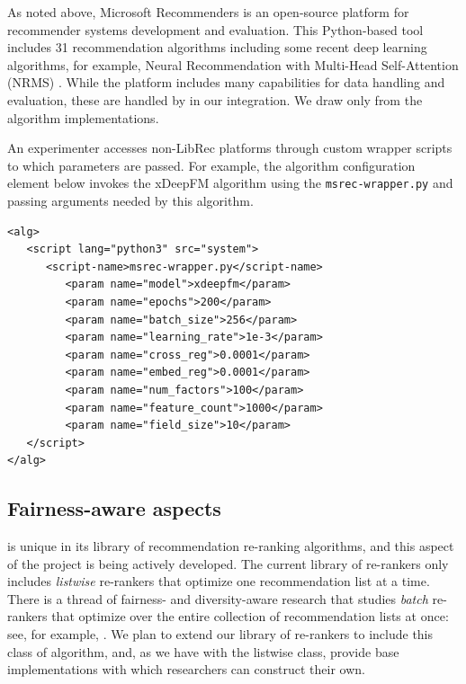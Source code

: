
As noted above, Microsoft Recommenders \cite{MicrosoftRecommenders} is an open-source platform for recommender systems development and evaluation. This Python-based tool includes 31 recommendation algorithms including some recent deep learning algorithms, for example, Neural Recommendation with Multi-Head Self-Attention (NRMS) \cite{wu2019neural}. While the platform includes many capabilities for data handling and evaluation, these are handled by \libauto{} in our integration. We draw only from the algorithm implementations. 

An experimenter accesses non-LibRec platforms through custom wrapper scripts to which parameters are passed. For example, the algorithm configuration element below invokes the xDeepFM  algorithm using the \texttt{msrec-wrapper.py} and passing arguments needed by this algorithm.

{\small
\begin{verbatim}
<alg>
   <script lang="python3" src="system">
      <script-name>msrec-wrapper.py</script-name>
         <param name="model">xdeepfm</param>
         <param name="epochs">200</param>
         <param name="batch_size">256</param>
         <param name="learning_rate">1e-3</param>
         <param name="cross_reg">0.0001</param>
         <param name="embed_reg">0.0001</param>
         <param name="num_factors">100</param>
         <param name="feature_count">1000</param>
         <param name="field_size">10</param>
   </script>
</alg>
\end{verbatim}}

\subsection{Fairness-aware aspects}
\libauto{} is unique in its library of recommendation re-ranking algorithms, and this aspect of the project is being actively developed. The current library of re-rankers only includes \textit{listwise} re-rankers that optimize one recommendation list at a time. There is a thread of fairness- and diversity-aware research that studies \textit{batch} re-rankers that optimize over the entire collection of recommendation lists at once: see, for example, \cite{surer2018multistakeholder,patro2020fairrec,mansoury2020fairmatch}. We plan to extend our library of re-rankers to include this class of algorithm, and, as we have with the listwise class, provide base implementations with which researchers can construct their own.

